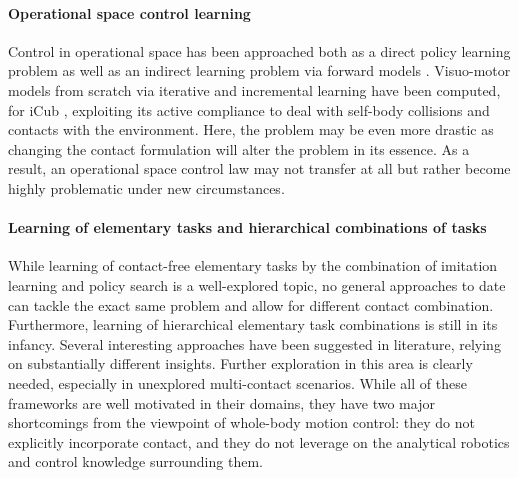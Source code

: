 \documentclass[final,5p,twocolumn]{elsarticle}
\begin{document}
\paragraph{Operational space control learning}
 Control in operational space has been approached both as a direct policy learning problem \cite{Peters2008a} as well as an indirect learning problem via forward models \cite{Salaun2010}. Visuo-motor models from scratch via iterative and incremental learning have been computed, for iCub \cite{Droniou2012}, exploiting its active compliance \cite{Ivaldi2011} to deal with self-body collisions and contacts with the environment. Here, the problem may be even more drastic as changing the contact formulation will alter the problem in its essence. As a result, an operational space control law may not transfer at all but rather become highly problematic under new circumstances. 

\paragraph{Learning of elementary tasks and hierarchical combinations of tasks}
While learning of contact-free elementary tasks by the combination of imitation learning and policy search \cite{Abbeel2005} \cite{Kober2010} is a well-explored topic, no general approaches to date can tackle the exact same problem and allow for different contact combination. Furthermore, learning of hierarchical elementary task combinations is still in its infancy. Several interesting approaches have been suggested \cite{Stulp2011a} \cite{Mulling2010} \cite{Muico2011} \cite{Daniel2012} in literature, relying on substantially different insights. Further exploration in this area is clearly needed, especially in unexplored multi-contact scenarios.
While all of these frameworks are well motivated in their domains, they have two major shortcomings from the viewpoint of whole-body motion control: they do not explicitly incorporate contact, and they do not leverage on the analytical robotics and control knowledge surrounding them.

%
\end{document}
